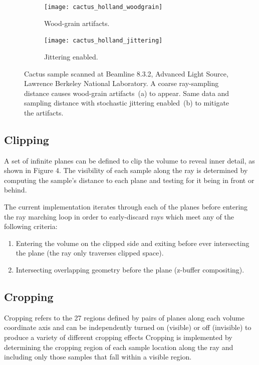 \begin{figure}[htb]
\centering
  \begin{subfigure}[b]{.5\columnwidth}
    \centering
    \texttt{[image: cactus\_holland\_woodgrain]}
    \caption{Wood-grain artifacts.}
    \label{fig:jittering_without}
  \end{subfigure}%
  \begin{subfigure}[b]{.5\columnwidth}
    \centering
    \texttt{[image: cactus\_holland\_jittering]}
    \caption{Jittering enabled.}
    \label{fig:jittering_with}
  \end{subfigure}
  \caption{Cactus sample scanned at Beamline 8.3.2, Advanced Light Source,
    Lawrence Berkeley National Laboratory. A coarse ray-sampling distance causes
    wood-grain artifacts~(a) to appear. Same data and sampling distance with
    stochastic jittering enabled~(b) to mitigate the artifacts.}
  \label{fig:jittering}
\end{figure}

\subsection{Clipping}
\label{clipping}
A set of infinite planes can be defined to clip the volume to reveal inner
detail, as shown in Figure 4.  The visibility of each sample along the ray
is determined by computing the sample's distance to each plane and testing
for it being in front or behind.

The current implementation iterates through each of the planes before entering
the ray marching loop in order to early-discard rays which meet any of the
following criteria:

\begin{enumerate}
\item Entering the volume on the clipped side and exiting before ever
  intersecting the plane (the ray only traverses clipped space).
\item Intersecting overlapping geometry before the plane (z-buffer compositing).
\end{enumerate}

\subsection{Cropping}
\label{cropping}
Cropping refers to the 27 regions defined by pairs of
planes along each volume coordinate axis and can be independently turned
on (visible) or off (invisible) to produce a variety of different cropping
effects%
Cropping is implemented by determining the cropping region of each sample
location along the ray and including only those samples that fall within
a visible region.


